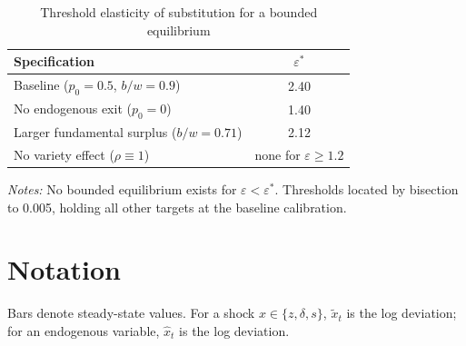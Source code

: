 \documentclass[authoryear, review, 12pt]{elsarticle}
\begin{document}
\begin{table}[h!]
	\centering
	\caption{Threshold elasticity of substitution for a bounded equilibrium}
	\label{tab:eps_threshold}
	\begin{tabular}{lc}
		\hline\hline
		Specification & $\varepsilon^*$ \\
		\hline
		Baseline ($p_0=0.5$, $b/w=0.9$) & 2.40 \\
		No endogenous exit ($p_0=0$) & 1.40 \\
		Larger fundamental surplus ($b/w=0.71$) & 2.12 \\
		No variety effect ($\rho\equiv1$) & none for $\varepsilon\geq1.2$ \\
		\hline\hline
	\end{tabular}
	\begin{minipage}{0.8\textwidth}
		\footnotesize\textit{Notes:} No bounded equilibrium exists for $\varepsilon<\varepsilon^*$.
		Thresholds located by bisection to 0.005, holding all other targets at the baseline
		calibration.
	\end{minipage}
\end{table}

	\section{Notation}\label{app:notation}

	Bars denote steady-state values. For a shock $x\in\{z,\delta,s\}$, $\tilde{x}_t$ is the log
	deviation; for an endogenous variable, $\hat{x}_t$ is the log deviation.
\end{document}
